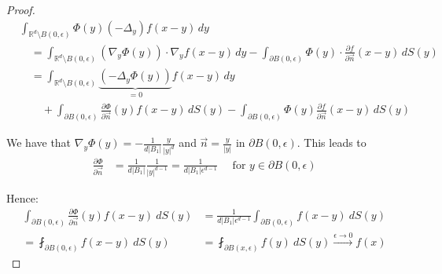 \documentclass{report}
\theoremstyle{tommy}
\begin{document}
\begin{proof}
\begin{align*}
      &\int_{\mathbb{R}^d \setminus B(0, \epsilon)} \Phi(y)(- \Delta_y) f(x-y) \, dy \\
      &\quad = \int_{\mathbb{R}^d \setminus B(0, \epsilon)} (\nabla_y \Phi(y)) \cdot \nabla_y f(x-y) \, dy - \int_{\partial B(0, \epsilon)} \Phi(y) \cdot  \frac{\partial f}{\partial \vec{n}}(x-y) \, dS(y) \\
      &\quad = \int_{\mathbb{R}^d \setminus B(0, \epsilon)} \underbrace{(-\Delta_y \Phi(y))}_{=0} f(x-y) \, dy \\ &\qquad + \int_{\partial B(0, \epsilon)} \frac{\partial \Phi}{\partial \vec{n}}(y) f(x-y) \, dS(y) - \int_{\partial B(0, \epsilon)} \Phi(y) \frac{\partial f}{\partial \vec{n}}(x-y) \, dS(y)
    \end{align*}

    We have that \(\nabla_y \Phi(y) = -\frac{1}{d |B_1|} \frac{y}{|y|^d}\) and \( \vec{n} = \frac{y}{|y|} \text{ in } \partial B(0, \epsilon)\). This leads to
      \begin{align*}
        \frac{\partial \Phi}{\partial \vec{n}} &= \frac{1}{d |B_1|} \frac{1}{|y|^{d-1}} = \frac{1}{d |B_1| \epsilon^{d-1}} \quad \text{ for } y \in \partial B(0, \epsilon)
      \end{align*}

      Hence:
      \begin{align*}
        \int_{\partial B(0, \epsilon)} \frac{\partial \Phi}{\partial \vec{n}}(y) f(x-y) \ dS(y) 
        &= \frac{1}{d |B_1| \epsilon^{d-1}} \int_{\partial B(0, \epsilon)} f(x-y) \ dS(y) \\
        = \fint_{\partial B(0, \epsilon)} f(x-y) \ dS(y)
        &= \fint_{\partial B(x, \epsilon)} f(y) \ dS(y) 
        \xrightarrow{\epsilon \to 0} f(x)
      \end{align*}


\end{proof}
\end{document}
